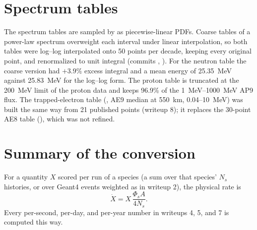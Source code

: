 \section{Spectrum tables}
The spectrum tables are sampled by \mcdc{} as piecewise-linear PDFs. Coarse tables of a power-law spectrum overweight each interval under linear interpolation, so both tables were log--log interpolated onto 50 points per decade, keeping every original point, and renormalized to unit integral (commits , ). For the neutron table the coarse version had $+3.9\%$ excess integral and a mean energy of \SI{25.35}{MeV} against \SI{25.83}{MeV} for the log--log form. The proton table is truncated at the \SI{200}{MeV} limit of the proton data and keeps 96.9\% of the \SIrange{1}{1000}{MeV} AP9 flux. The trapped-electron table (, AE9 median at 550~km, 0.04--\SI{10}{MeV}) was built the same way from 21 published points (writeup 8); it replaces the 30-point AE8 table (), which was not refined.


\section{Summary of the conversion}
For a quantity $X$ scored per run of a species (a sum over that species' $N_s$ histories, or over Geant4 events weighted as in writeup 2), the physical rate is
\begin{equation}
  \dot X = X\,\frac{\Phi_s A}{4N_s}.
\end{equation}
Every per-second, per-day, and per-year number in writeups 4, 5, and 7 is computed this way.



